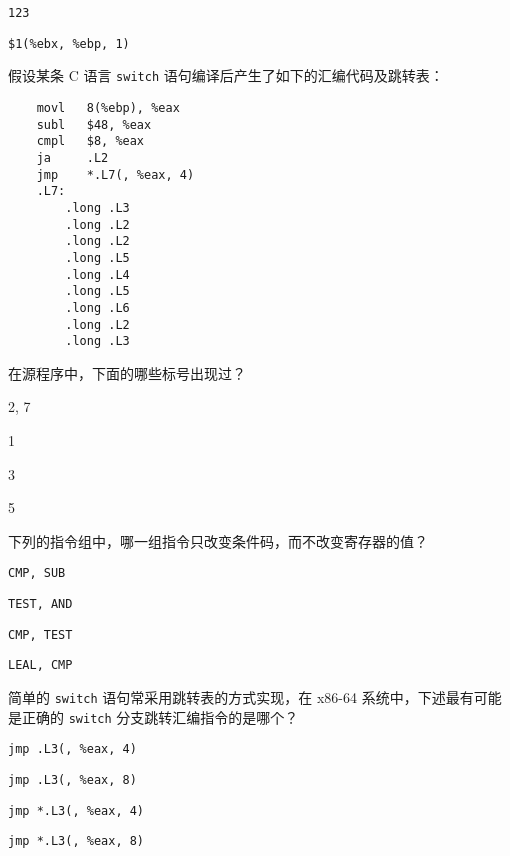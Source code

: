 \begin{problems}
\begin{choices}
            \item \verb|123|
            \item \verb|$1(%ebx, %ebp, 1)|
        \end{choices}
         假设某条 C 语言 \verb|switch| 语句编译后产生了如下的汇编代码及跳转表：
        \begin{verbatim}
    movl   8(%ebp), %eax
    subl   $48, %eax
    cmpl   $8, %eax
    ja     .L2
    jmp    *.L7(, %eax, 4)
    .L7:
        .long .L3
        .long .L2
        .long .L2
        .long .L5
        .long .L4
        .long .L5
        .long .L6
        .long .L2
        .long .L3
        \end{verbatim}
        在源程序中，下面的哪些标号出现过？
        \begin{choices}
            \item 2, 7
            \item 1
            \item 3
            \item 5
        \end{choices}
         下列的指令组中，哪一组指令只改变条件码，而不改变寄存器的值？
        \begin{choices}
            \item \verb|CMP, SUB|
            \item \verb|TEST, AND|
            \item \verb|CMP, TEST|
            \item \verb|LEAL, CMP|
        \end{choices}
         简单的 \verb|switch| 语句常采用跳转表的方式实现，在 x86-64 系统中，下述最有可能是正确的 \verb|switch| 分支跳转汇编指令的是哪个？
        \begin{choices}
            \item \verb|jmp .L3(, %eax, 4)|
            \item \verb|jmp .L3(, %eax, 8)|
            \item \verb|jmp *.L3(, %eax, 4)|
            \item \verb|jmp *.L3(, %eax, 8)|
        \end{choices}
    \end{problems}